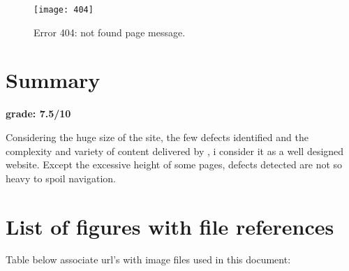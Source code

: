 \documentclass[
10pt, %
a4paper, %
oneside, %
headinclude,footinclude, %
BCOR5mm, %
]{scrartcl}
\begin{document}
	\begin{figure}[t]
	\centering 
	\centerline{\texttt{[image: 404]}}
	\caption[Not found page]{Error 404: not found page message.}
	\label{fig:not-found-page} 
	\end{figure}


\clearpage
\section{Summary}
	\begin{centering}
	{ \huge \bfseries grade: 7.5/10 \\[0.3cm] }
	\end{centering}
	Considering the huge size of the site, the few defects identified and the complexity and variety of content delivered by \thesite{}, i consider it as a well designed website. Except the excessive height of some pages, defects detected are not so heavy to spoil navigation.



\section{List of figures with file references}
Table below associate url's with image files used in this document:
\end{document}
